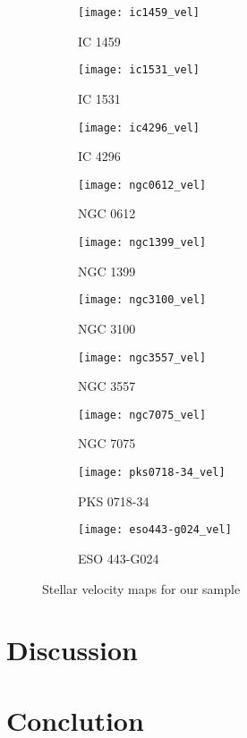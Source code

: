 \documentclass[a4paper,fleqn,usenatbib,useAMS]{mnras}
\begin{document}
	\begin{figure}
		\centering
		\begin{subfigure}{0.23\textwidth}
			\centering
			\texttt{[image: ic1459\_vel]}
			\caption{IC 1459}
			\label{subfig:ic1459}
		\end{subfigure}
		\begin{subfigure}{0.23\textwidth}
			\centering
			\texttt{[image: ic1531\_vel]}
			\caption{IC 1531}
			\label{subfig:ic1531}
		\end{subfigure}
		\begin{subfigure}{0.23\textwidth}
			\centering
			\texttt{[image: ic4296\_vel]}
			\caption{IC 4296}
			\label{subfig:ic4296}
		\end{subfigure}
		\begin{subfigure}{0.23\textwidth}
			\centering
			\texttt{[image: ngc0612\_vel]}
			\caption{NGC 0612}
			\label{subfig:ngc0612}
		\end{subfigure}
		\begin{subfigure}{0.23\textwidth}
			\centering
			\texttt{[image: ngc1399\_vel]}
			\caption{NGC 1399}
			\label{subfig:ngc1399}
		\end{subfigure}
		\begin{subfigure}{0.23\textwidth}
			\centering
			\texttt{[image: ngc3100\_vel]}
			\caption{NGC 3100}
			\label{subfig:ngc3100}
		\end{subfigure}
		\begin{subfigure}{0.23\textwidth}
			\centering
			\texttt{[image: ngc3557\_vel]}
			\caption{NGC 3557}
			\label{subfig:ngc3557}
		\end{subfigure}
		\begin{subfigure}{0.23\textwidth}
			\centering
			\texttt{[image: ngc7075\_vel]}
			\caption{NGC 7075}
			\label{subfig:ngc7075}
		\end{subfigure}
		\begin{subfigure}{0.23\textwidth}
			\centering
			\texttt{[image: pks0718-34\_vel]}
			\caption{PKS 0718-34}
			\label{subfig:pks0718-34}
		\end{subfigure}
		\begin{subfigure}{0.23\textwidth}
			\centering
			\texttt{[image: eso443-g024\_vel]}
			\caption{ESO 443-G024}
			\label{subfig:eso443-g024}
		\end{subfigure}
		\caption{Stellar velocity maps for our sample}
		\label{fig:velmaps}
	\end{figure}


\section{Discussion}
	\label{sec:discuss}

\section{Conclution}
	\label{sec:conc}


\floatbarrier


{}
\end{document}
